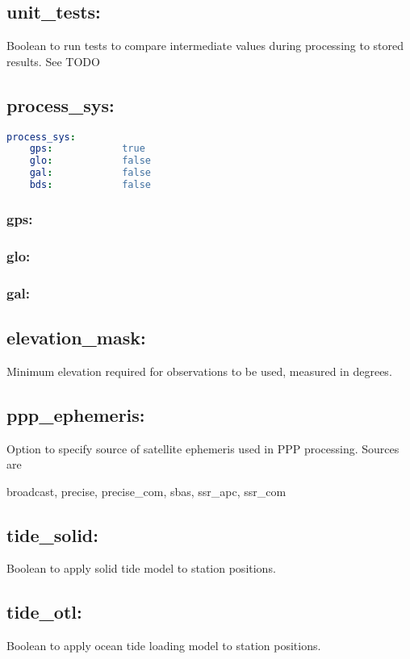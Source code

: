 \subsection{unit\_tests:}
Boolean to run tests to compare intermediate values during processing to stored results. See TODO

\subsection{process\_sys:}
\begin{lstlisting}[language=yaml,caption=process\_sys:]
process_sys:
    gps:            true
    glo:            false
    gal:            false
    bds:            false
\end{lstlisting}

\subsubsection{gps:}
\subsubsection{glo:}
\subsubsection{gal:}

\subsection{elevation\_mask:}
Minimum elevation required for observations to be used, measured in degrees.

\subsection{ppp\_ephemeris:}
Option to specify source of satellite ephemeris used in PPP processing. Sources are

broadcast,
precise,
precise\_com,
sbas,
ssr\_apc,
ssr\_com

\subsection{tide\_solid:}
Boolean to apply solid tide model to station positions.
\subsection{tide\_otl:}
Boolean to apply ocean tide loading model to station positions.
